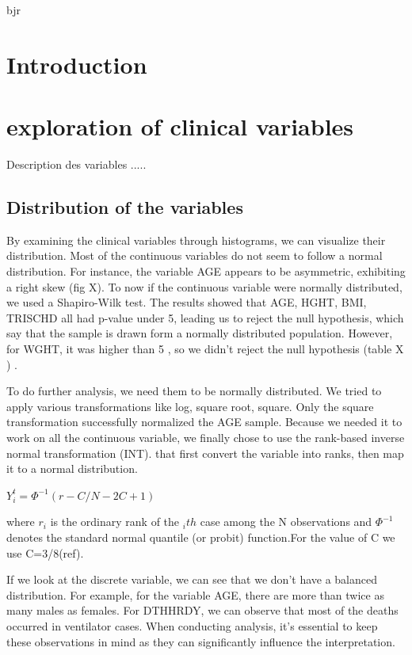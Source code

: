 \documentclass[a4paper, 11pt]{article}
\begin{document}
\begin{multicols}{2}
	bjr
\section{Introduction}
\lipsum

\section{exploration of  clinical variables}
Description des variables .....  

\subsection{Distribution of the variables }

By examining the clinical variables through histograms, we can visualize their distribution. Most of the continuous variables do not seem to follow a normal distribution. For instance, the variable AGE appears to be asymmetric, exhibiting a right skew (fig X).
To now if the continuous variable were normally distributed, we used a Shapiro-Wilk test. The results showed that AGE, HGHT, BMI, TRISCHD all had p-value under 5, leading us to reject the null hypothesis, which say that the sample is drawn form a normally distributed population. However, for WGHT, it was higher than 5 , so we didn’t reject the null hypothesis (table X ) . 

To do further analysis, we need them to be normally distributed. We tried to apply various transformations like log, square root, square. Only the square transformation successfully normalized the AGE sample. 
Because we needed it to work on all the continuous variable, we finally chose to use the rank-based inverse normal transformation (INT). that first convert the variable into ranks, then map it to a normal distribution. 

$ Y^t_{i}=  \Phi^{-1}(r-C/N-2C+1) $

where $r_i$ is the ordinary rank of the $_ith$ case among the N observations and $\Phi^{-1}$ denotes the standard normal quantile (or probit) function.For the value of C we use C=3/8(ref).

If we look at the discrete variable, we can see that we don't have a balanced distribution. For example, for the variable AGE, there are more than twice as many males as females. For DTHHRDY, we can observe that most of the deaths occurred in ventilator cases. When conducting analysis, it's essential to keep these observations in mind as they can significantly influence the interpretation. 



\end{multicols}
\end{document}
